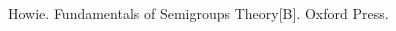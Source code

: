 \pagestyle{fancy}
\fancyhead{} %

\fancyhead[CO]{\leftmark} %



\begin{thebibliography}{99}


 Howie. Fundamentals of Semigroups Theory[B]. Oxford Press.

\end{thebibliography}

